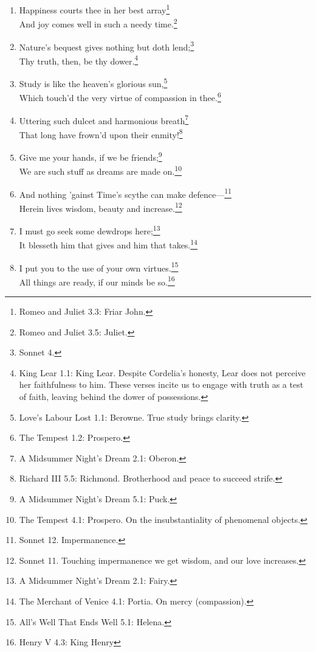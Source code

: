 \documentclass[17pt,twoside]{extarticle}
\begin{document}
\begin{enumerate}
{    Denmark 3.1: Hamlet.}\\Lies rich in virtue and unmingled.\footnote{Troilus
    and Cressida 1.3: Agamemnon.}
\item
  Happiness courts thee in her best array\footnote{Romeo and Juliet 3.3:
    Friar John.}\\And joy comes well in such a needy time.\footnote{Romeo
    and Juliet 3.5: Juliet.}
\item
  Nature's bequest gives nothing but doth lend;\footnote{Sonnet 4.}\\Thy
  truth, then, be thy dower.\footnote{King Lear 1.1: King Lear. Despite
    Cordelia's honesty, Lear does not perceive her faithfulness to him.
    These verses incite us to engage with truth as a test of faith,
    leaving behind the dower of possessions.}
\item
  Study is like the heaven's glorious sun,\footnote{Love's Labour Lost
    1.1: Berowne. True study brings clarity.}\\Which touch'd the very
  virtue of compassion in thee.\footnote{The Tempest 1.2: Prospero.}
\item
  Uttering such dulcet and harmonious breath\footnote{A Midsummer
    Night's Dream 2.1: Oberon.}\\That long have frown'd upon their
  enmity!\footnote{Richard III 5.5: Richmond. Brotherhood and peace to
    succeed strife.}
\item
  Give me your hands, if we be friends;\footnote{A Midsummer Night's
    Dream 5.1: Puck.}\\We are such stuff as dreams are made
  on.\footnote{The Tempest 4.1: Prospero. On the insubstantiality of
    phenomenal objects.}
\item
  And nothing 'gainst Time's scythe can make defence---\footnote{Sonnet
    12. Impermanence.}\\Herein lives wisdom, beauty and
  increase.\footnote{Sonnet 11. Touching impermanence we get wisdom, and
    our love increases.}
\item
  I must go seek some dewdrops here;\footnote{A Midsummer Night's Dream
    2.1: Fairy.}\\It blesseth him that gives and him that
  takes.\footnote{The Merchant of Venice 4.1: Portia. On mercy
    (compassion).}
\item
  I put you to the use of your own virtues.\footnote{All's Well That
    Ends Well 5.1: Helena.}\\All things are ready, if our minds be
  so.\footnote{Henry V 4.3: King Henry}

\end{enumerate}
\end{document}
